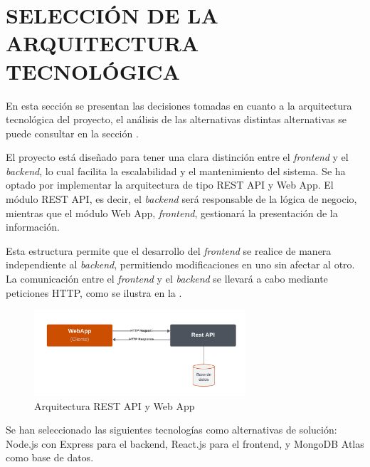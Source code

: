 \section{SELECCIÓN DE LA ARQUITECTURA TECNOLÓGICA} \label{sec:4_seleccion_arquitectura_tecnologica}
\hypertarget{sec:4_seleccion_arquitectura_tecnologica}{}

En esta sección se presentan las decisiones tomadas en cuanto a la arquitectura tecnológica del proyecto, el análisis de las alternativas distintas alternativas se 
puede consultar en la sección .


El proyecto está diseñado para tener una clara distinción entre el \textit{frontend} y el \textit{backend}, lo cual facilita la escalabilidad y el mantenimiento del sistema. 
Se ha optado por implementar la arquitectura de tipo REST API y Web App. El módulo REST API, es decir, el \textit{backend} será responsable de la lógica de negocio, 
mientras que el módulo Web App, \textit{frontend}, gestionará la presentación de la información. 

Esta estructura permite que el desarrollo del \textit{frontend} se realice de manera independiente al \textit{backend}, permitiendo modificaciones en uno sin afectar al otro. 
La comunicación entre el \textit{frontend} y el \textit{backend} se llevará a cabo mediante peticiones HTTP, como se ilustra en la .


\begin{figure}[H]
    \centering
    \includegraphics[width=0.7\textwidth]{figures/4-Arquitectura-tecnologica/4_REST.png}
    \caption{Arquitectura REST API y Web App}
    \label{fig:arquitectura_rest}
    \hypertarget{fig:arquitectura_rest}{}
\end{figure}


Se han seleccionado las siguientes tecnologías como alternativas de solución: Node.js con Express para el backend, React.js para el frontend, y MongoDB Atlas como base 
de datos.

